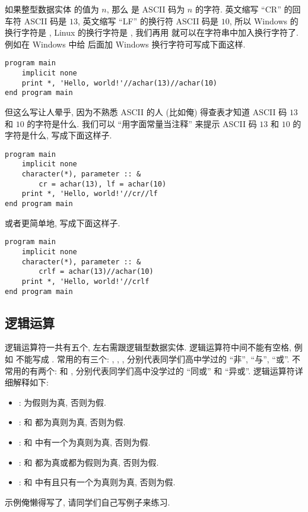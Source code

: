 如果整型数据实体 \ttt{[n]} 的值为 $n$, 那么  是 ASCII 码为 $n$ 的字符. 英文缩写 ``CR'' 的回车符 ASCII 码是 $13$, 英文缩写 ``LF'' 的换行符 ASCII 码是 $10$, 所以 Windows 的换行字符是 , Linux 的换行字符是 , 我们再用 \ttt{//} 就可以在字符串中加入换行字符了. 例如在 Windows 中给  后面加 Windows 换行字符可写成下面这样.
\begin{lstlisting}
program main
    implicit none
    print *, 'Hello, world!'//achar(13)//achar(10)
end program main
\end{lstlisting}
但这么写让人晕乎, 因为不熟悉 ASCII 的人 (比如俺) 得查表才知道 ASCII 码 $13$ 和 $10$ 的字符是什么. 我们可以 ``用字面常量当注释'' 来提示 ASCII 码 $13$ 和 $10$ 的字符是什么, 写成下面这样子.
\begin{lstlisting}
program main
    implicit none
    character(*), parameter :: &
        cr = achar(13), lf = achar(10)
    print *, 'Hello, world!'//cr//lf
end program main
\end{lstlisting}
或者更简单地, 写成下面这样子.
\begin{lstlisting}
program main
    implicit none
    character(*), parameter :: &
        crlf = achar(13)//achar(10)
    print *, 'Hello, world!'//crlf
end program main
\end{lstlisting}

\subsection{逻辑运算}

逻辑运算符一共有五个, 左右需跟逻辑型数据实体. 逻辑运算符中间不能有空格, 例如  不能写成 . 常用的有三个: , , , 分别代表同学们高中学过的 ``非'', ``与'', ``或''. 不常用的有两个:  和 , 分别代表同学们高中没学过的 ``同或'' 和 ``异或''. 逻辑运算符详细解释如下:
\begin{itemize}
    \item {}: \ttt{[b]} 为假则为真, 否则为假.
    \item {}: \ttt{[a]} 和 \ttt{[b]} 都为真则为真, 否则为假.
    \item {}: \ttt{[a]} 和 \ttt{[b]} 中有一个为真则为真, 否则为假.
    \item {}: \ttt{[a]} 和 \ttt{[b]} 都为真或都为假则为真, 否则为假.
    \item {}: \ttt{[a]} 和 \ttt{[b]} 中有且只有一个为真则为真, 否则为假.
\end{itemize}
示例俺懒得写了, 请同学们自己写例子来练习.

